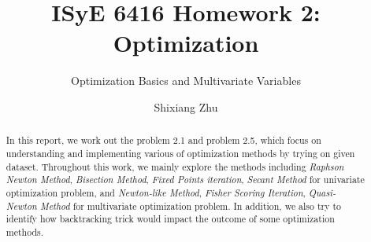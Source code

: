 \documentclass[sigconf]{acmart}
\begin{document}
\title{ISyE 6416 Homework 2: Optimization}
\subtitle{Optimization Basics and Multivariate Variables}

\author{Shixiang Zhu}

\begin{abstract}
In this report, we work out the problem 2.1 and problem 2.5, which focus on understanding and implementing various of optimization methods by trying on given dataset. Throughout this work, we mainly explore the methods including \textit{Raphson Newton Method}, \textit{Bisection Method}, \textit{Fixed Points iteration}, \textit{Secant Method} for univariate optimization problem, and \textit{Newton-like Method}, \textit{Fisher Scoring Iteration}, \textit{Quasi-Newton Method} for multivariate optimization problem. In addition,  we also try to identify how backtracking trick would impact the outcome of some optimization methods. 
\end{abstract}


\maketitle
\newcommand{\norm}[1]{\left\lVert#1\right\rVert}
\newcommand{\code}[1]{\texttt{#1}}


% 
% 
\end{document}

